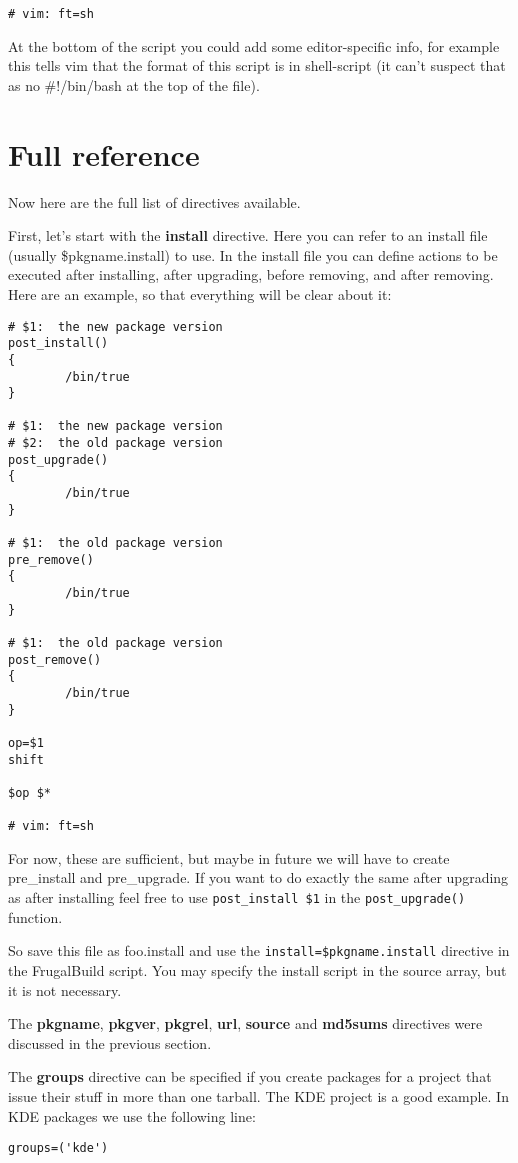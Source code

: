 \begin{verbatim}
# vim: ft=sh
\end{verbatim}

At the bottom of the script you could add some editor-specific info, for example this tells vim that the format of this script is in shell-script (it can't suspect that as no #!/bin/bash at the top of the file).

\section{Full reference}

Now here are the full list of directives available.

First, let's start with the \textbf{install} directive. Here you can refer to an install file (usually \$pkgname.install) to use. In the install file you can define actions to be executed after installing, after upgrading, before removing, and after removing. Here are an example, so that everything will be clear about it:

\begin{verbatim}
# $1:  the new package version
post_install()
{
        /bin/true
}

# $1:  the new package version
# $2:  the old package version
post_upgrade()
{
        /bin/true
}

# $1:  the old package version
pre_remove()
{
        /bin/true
}

# $1:  the old package version
post_remove()
{
        /bin/true
}

op=$1
shift

$op $*

# vim: ft=sh
\end{verbatim}

For now, these are sufficient, but maybe in future we will have to create pre\_install and pre\_upgrade. If you want to do exactly the same after upgrading as after installing feel free to use {\tt post\_install \$1} in the {\tt post\_upgrade()} function.

So save this file as foo.install and use the {\tt install=\$pkgname.install} directive in the FrugalBuild script.
You may specify the install script in the source array, but it is not necessary.

The \textbf{pkgname}, \textbf{pkgver}, \textbf{pkgrel}, \textbf{url}, \textbf{source}  and \textbf{md5sums} directives were discussed in the previous section.

The \textbf{groups} directive can be specified if you create packages for a project that issue their stuff in more than one tarball. The KDE project is a good example. In KDE packages we use the following line:
\begin{verbatim}
groups=('kde')
\end{verbatim}

